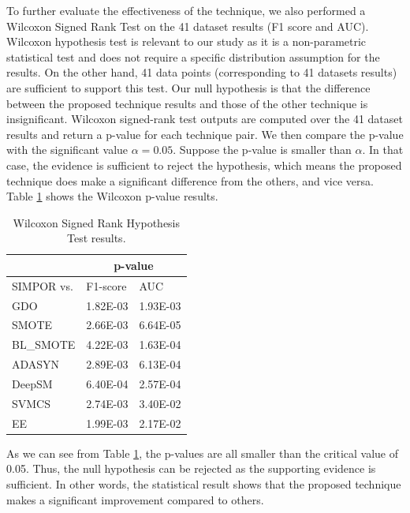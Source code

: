 To further evaluate the effectiveness of the technique, we also performed a Wilcoxon Signed Rank Test \cite{wilcoxon} on the 41 dataset results (F1 score and AUC). Wilcoxon hypothesis test is relevant to our study as it is a non-parametric statistical test and does not require a specific distribution assumption for the results. On the other hand, 41 data points (corresponding to 41 datasets results) are sufficient to support this test. Our null hypothesis is that the difference between the proposed technique results and those of the other technique is insignificant. Wilcoxon signed-rank test outputs are computed over the 41 dataset results and return a p-value for each technique pair. We then compare the p-value with the significant value $\alpha = 0.05$. Suppose the p-value is smaller than $\alpha$. In that case, the evidence is sufficient to reject the hypothesis, which means the proposed technique does make a significant difference from the others, and vice versa. Table \ref{tab:wilcoxonTest} shows the Wilcoxon p-value results.

	\begin{table}[htbp]
		\centering
		\caption{Wilcoxon Signed Rank Hypothesis Test results.}
		
		\begin{tabular}{lcc}
			\toprule
			& \multicolumn{2}{c}{p-value} \\
			\midrule
			SIMPOR vs. & \multicolumn{1}{l|}{F1-score} & \multicolumn{1}{l}{AUC} \\
			\midrule
			GDO   & 1.82E-03 & 1.93E-03 \\
			SMOTE & 2.66E-03 & 6.64E-05 \\
			BL\_SMOTE & 4.22E-03 & 1.63E-04 \\
			ADASYN & 2.89E-03 & 6.13E-04 \\
			DeepSM   & 6.40E-04 & 2.57E-04 \\
			SVMCS & 2.74E-03 & 3.40E-02 \\
			EE    & 1.99E-03 & 2.17E-02 \\
			\bottomrule
		\end{tabular}%
		\label{tab:wilcoxonTest}%
	\end{table}%

As we can see from Table \ref{tab:wilcoxonTest}, the p-values are all smaller than the critical value of 0.05. Thus, the null hypothesis can be rejected as the supporting evidence is sufficient. In other words, the statistical result shows that the proposed technique makes a significant improvement compared to others.     



